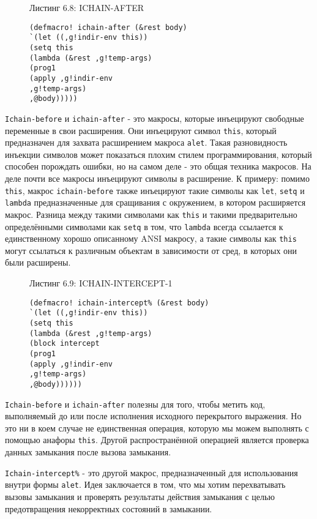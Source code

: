 \begin{figure}Листинг 6.8: ICHAIN-AFTER\label{listing_6.8}
\listbegin
\begin{verbatim}
(defmacro! ichain-after (&rest body)
`(let ((,g!indir-env this))
(setq this
(lambda (&rest ,g!temp-args)
(prog1
(apply ,g!indir-env
,g!temp-args)
,@body)))))
\end{verbatim}
\listend
\end{figure}

\verb"Ichain-before" и \verb"ichain-after" - это макросы, которые инъецируют свободные переменные в свои расширения. Они инъецируют символ \verb"this", который предназначен для захвата расширением макроса \verb"alet". Такая разновидность инъекции символов может показаться плохим стилем программирования, который способен порождать ошибки, но на самом деле - это общая техника макросов. На деле почти все макросы инъецируют символы в расширение. К примеру: помимо \verb"this", макрос \verb"ichain-before" также инъецируют такие символы как \verb"let", \verb"setq" и \verb"lambda" предназначенные для сращивания с окружением, в котором расширяется макрос. Разница между такими символами как \verb"this" и такими предварительно определёнными символами как \verb"setq" в том, что \verb"lambda" всегда ссылается к единственному хорошо описанному ANSI макросу, а такие символы как \verb"this" могут ссылаться к различным объектам в зависимости от сред, в которых они были расширены.

\begin{figure}Листинг 6.9: ICHAIN-INTERCEPT-1\label{listing_6.9}
\listbegin
\begin{verbatim}
(defmacro! ichain-intercept% (&rest body)
`(let ((,g!indir-env this))
(setq this
(lambda (&rest ,g!temp-args)
(block intercept
(prog1
(apply ,g!indir-env
,g!temp-args)
,@body))))))
\end{verbatim}
\listend
\end{figure}

\verb"Ichain-before" и \verb"ichain-after" полезны для того, чтобы метить код, выполняемый до или после исполнения исходного перекрытого выражения. Но это ни в коем случае не единственная операция, которую мы можем выполнять с помощью анафоры \verb"this". Другой распространённой операцией является проверка данных замыкания после вызова замыкания.

\verb"Ichain-intercept%" - это другой макрос, предназначенный для использования внутри формы \verb"alet". Идея заключается в том, что мы хотим перехватывать вызовы замыкания и проверять результаты действия замыкания с целью предотвращения некорректных состояний в замыкании.

